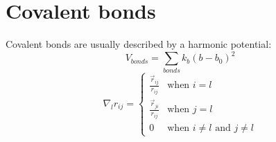 \documentclass[11pt]{book}
\begin{document}

\section{Covalent bonds}
Covalent bonds are usually described by a harmonic potential:
\begin{equation}\label{eq:ff-covalent}
V_{bonds} = \sum_{bonds}k_b(b-b_0)^2
\end{equation}
\begin{equation}\label{eq:ff-gradr}
\nabla_{l}r_{ij} =
\begin{cases}
	\frac{\vec{r}_{ij}}{r_{ij}} & \text{when } i = l\\
	\frac{\vec{r}_{ji}}{r_{ij}} & \text{when } j = l\\
	0                           & \text{when } i \ne l \text{ and } j \ne l
\end{cases}
\end{equation}

\end{document}
